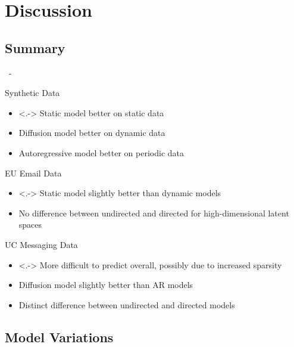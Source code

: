 \documentclass{beamer}
\newenvironment{xframe}
    {\begin{frame}{
        \ifx\insertsubsection\empty
            \strut
        \else\ifx\insertsubsubsection\empty
            \insertsection
        \else
            \insertsection~-~\insertsubsection
        \fi\fi
    }{
        \ifx\insertsubsection\empty
            \insertsection
        \else\ifx\insertsubsubsection\empty
            \insertsubsection
        \else
            \insertsubsubsection
        \fi\fi
    }}
    {\end{frame}}
\newenvironment{xblock}[1]
    {\begin{block}{#1}}
    {\end{block}}
\begin{document}
\section{Discussion}

    \subsection{Summary}
    
    \begin{xframe}
        \begin{xblock}{Synthetic Data}
            \begin{itemize}
                \item<.-> Static model better on static data
                \item Diffusion model better on dynamic data
                \item Autoregressive model better on periodic data
            \end{itemize}
        \end{xblock}
        
        \begin{xblock}{EU Email Data}
            \begin{itemize}
                \item<.-> Static model slightly better than dynamic models
                \item No difference between undirected and directed for high-dimensional latent spaces
            \end{itemize}
        \end{xblock}
        
        \begin{xblock}{UC Messaging Data}
            \begin{itemize}
                \item<.-> More difficult to predict overall, possibly due to increased sparsity
                \item Diffusion model slightly better than AR models
                \item Distinct difference between undirected and directed models
            \end{itemize}
        \end{xblock}
    \end{xframe}

    \subsection{Model Variations}
    
\end{document}
